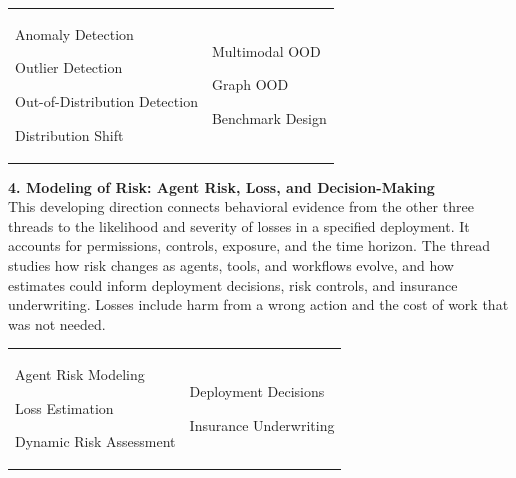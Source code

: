 \documentclass[margin,line,pifont,palatino,courier]{res}
\newenvironment{list1}{
  \begin{list}{\ding{113}}{%
      \setlength{\itemsep}{0in}
      \setlength{\parsep}{0in} \setlength{\parskip}{0in}
      \setlength{\topsep}{0in} \setlength{\partopsep}{0in}
      \setlength{\leftmargin}{0.17in}}}{\end{list}}
\begin{document}
\begin{resume}
\vspace{-0.15in}
\begin{tabular}{@{}p{}p{}}
\begin{list1}
\item Anomaly Detection
\item Outlier Detection
\item Out-of-Distribution Detection
\item Distribution Shift
\end{list1}
&
\begin{list1}
\item Multimodal OOD
\item Graph OOD
\item Benchmark Design
\end{list1}
\end{tabular}


{\color{uscred}\textbf{4. Modeling of Risk: Agent Risk, Loss, and Decision-Making}}\\
This developing direction connects behavioral evidence from the other three
threads to the likelihood and severity of losses in a specified deployment. It
accounts for permissions, controls, exposure, and the time horizon. The thread studies
how risk changes as agents, tools, and workflows evolve, and how estimates could
inform deployment decisions, risk controls, and insurance underwriting. Losses
include harm from a wrong action and the cost of work that was not needed.

\vspace{-0.15in}
\begin{tabular}{@{}p{}p{}}
\begin{list1}
\item Agent Risk Modeling
\item Loss Estimation
\item Dynamic Risk Assessment
\end{list1}
&
\begin{list1}
\item Deployment Decisions
\item Insurance Underwriting
\end{list1}
\end{tabular}


\end{resume}
\end{document}
